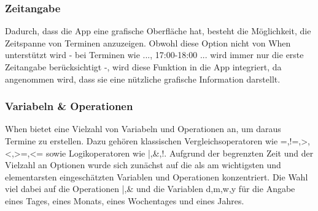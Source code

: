 \subsubsection{Zeitangabe}
Dadurch, dass die App eine grafische Oberfläche hat, besteht die Möglichkeit, die Zeitspanne von Terminen anzuzeigen. Obwohl diese Option nicht von When unterstützt wird - bei Terminen wie \glqq..., 17:00-18:00 ...\grqq{} wird immer nur die erste Zeitangabe berücksichtigt -, wird diese Funktion in die App integriert, da angenommen wird, dass sie eine nützliche grafische Information darstellt.%
%
%
%
%
%
\subsubsection{Variabeln \& Operationen}
When bietet eine Vielzahl von Variabeln und Operationen an, um daraus Termine zu erstellen. Dazu gehören klassischen Vergleichsoperatoren wie \glqq =,!=,>,<,>=,<=\grqq{} sowie Logikoperatoren wie \glqq|,\&,!\grqq{}. %
Aufgrund der begrenzten Zeit und der Vielzahl an Optionen wurde sich zunächst auf die als am wichtigsten und elementarsten eingeschätzten Variablen und Operationen konzentriert. Die Wahl viel dabei auf die Operationen \glqq|,\&\grqq{} und die Variablen \glqq d,m,w,y\grqq{} für die Angabe eines Tages, eines Monats, eines Wochentages und eines Jahres.%
%
%
%
%
%
